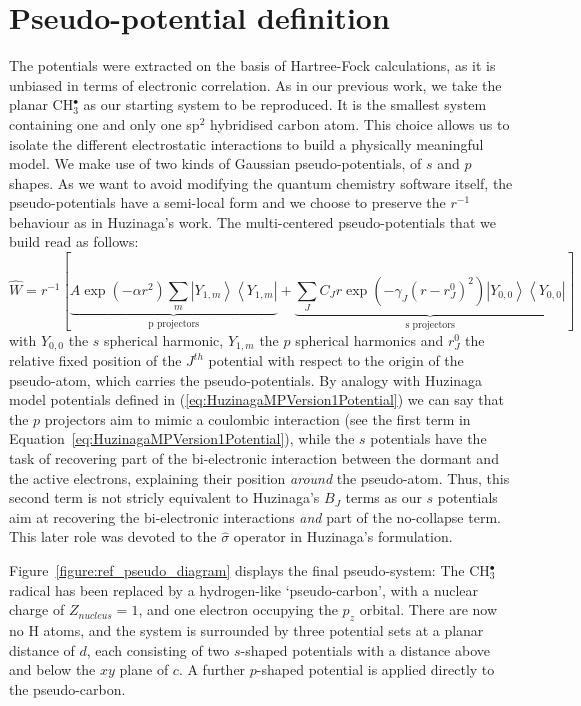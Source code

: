 \documentclass[12pt]{article}
\begin{document}
\section*{\sffamily \large Pseudo-potential definition} \label{secpotdef}

The potentials were extracted on the basis of Hartree-Fock calculations, as it is unbiased in terms of
electronic correlation. 
As in our previous work,\cite{drujon_pseudopotentials_2013}
we take the planar CH\(^{\bullet}_{3}\) as our starting system to be reproduced.
It is the smallest system containing one and only one sp$^2$ hybridised carbon atom. This choice allows us to isolate the different electrostatic interactions to build a physically meaningful model. We make use of two kinds of Gaussian pseudo-potentials,\cite{me_structure_theory} of \(s\) and \(p\) shapes. As we want to avoid modifying the quantum chemistry software itself, the pseudo-potentials have a semi-local form and we choose to preserve the \(r^{-1}\) behaviour as in Huzinaga's work.
The multi-centered pseudo-potentials that we build read as follows:
\begin{equation}
\label{eq:ourPP}
\hat{W} = r^{-1}\left[%
\underbrace{A\exp(-\alpha r^2)\sum_m\left|Y_{1,m}\right>\left<Y_{1,m}\right|}_{\text{p projectors}}%
+%
\underbrace{\sum_JC_Jr\exp(-\gamma_J (r-r^0_J)^2)\left|Y_{0,0}\right>\left<Y_{0,0}\right|}_{\text{s projectors}}%
\right]
\end{equation}
with $Y_{0,0}$ the $s$ spherical harmonic, $Y_{1,m}$ the $p$ spherical harmonics and $r^0_J$ the relative fixed position of the $J^{th}$ potential with respect to the origin of the pseudo-atom, which carries the pseudo-potentials.
By analogy with Huzinaga model potentials defined in (\ref{eq:HuzinagaMPVersion1Potential})
we can say that the $p$ projectors aim to mimic a coulombic interaction (see the first term in Equation~\ref{eq:HuzinagaMPVersion1Potential}),
while the $s$ potentials have the task of recovering part of the bi-electronic interaction
between the dormant and the active electrons, explaining their position \textit{around} the pseudo-atom.
Thus, this second term is not stricly equivalent to Huzinaga's $B_J$ terms as our $s$ potentials aim at recovering
the bi-electronic interactions \textit{and} part of the no-collapse term.
This later role was devoted to the $\hat{\sigma}$ operator in Huzinaga's formulation.

Figure~\ref{figure:ref_pseudo_diagram} displays the final pseudo-system: The CH\(^{\bullet}_{3}\) radical has been replaced by a hydrogen-like `pseudo-carbon', with a nuclear charge of \(Z_{nucleus} = 1\), and one electron occupying the \(p_{z}\) orbital. 
There are now no H atoms, and the system is surrounded by three potential sets at a planar distance of \(d\), each consisting of 
two \(s\)-shaped potentials with a distance above and below the \(xy\) plane of \(c\). A further \(p\)-shaped potential is applied
directly to the pseudo-carbon.
\end{document}
